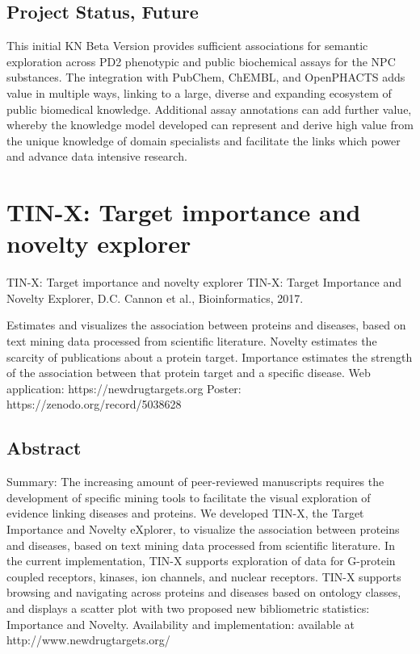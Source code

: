 \subsection{Project Status, Future}

This initial KN Beta Version provides sufficient associations for semantic exploration across PD2 phenotypic and public biochemical assays for the NPC substances.  The integration with PubChem, ChEMBL, and OpenPHACTS adds value in multiple ways, linking to a large, diverse and expanding ecosystem of public biomedical knowledge.  Additional assay annotations can add further value, whereby the knowledge model developed can represent and derive high value from the unique knowledge of domain specialists and facilitate the links which power and advance data intensive research.



\section{TIN-X: Target importance and novelty explorer}

TIN-X: Target importance and novelty explorer
TIN-X: Target Importance and Novelty Explorer, D.C. Cannon et al., Bioinformatics, 2017\cite{Cannon2017-af}.

Estimates and visualizes the association between proteins and diseases, based on text mining data processed from scientific literature.  Novelty estimates the scarcity of publications about a protein target. Importance estimates the strength of the association between that protein target and a specific disease.
Web application: https://newdrugtargets.org
Poster: https://zenodo.org/record/5038628

\subsection{Abstract}

Summary: The increasing amount of peer-reviewed manuscripts requires the development of specific mining tools to facilitate the visual exploration of evidence linking diseases and proteins. We developed TIN-X, the Target Importance and Novelty eXplorer, to visualize the association between proteins and diseases, based on text mining data processed from scientific literature. In the current implementation, TIN-X supports exploration of data for G-protein coupled receptors, kinases, ion channels, and nuclear receptors. TIN-X supports browsing and navigating across proteins and diseases based on ontology classes, and displays a scatter plot with two proposed new bibliometric statistics: Importance and Novelty. 
Availability  and implementation:  available at http://www.newdrugtargets.org/

